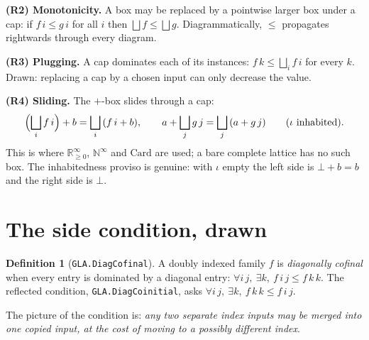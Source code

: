 \documentclass[11pt,a4paper]{article}
\newcommand{\lean}[1]{\texttt{\small #1}}
\newcommand{\Rzi}{\mathbb{R}_{\geq 0}^{\infty}}
\newcommand{\Ninf}{\mathbb{N}^{\infty}}
\newcommand{\Card}{\mathrm{Card}}
\theoremstyle{definition}
\newtheorem{definition}{Definition}[section]
\theoremstyle{plain}
\theoremstyle{remark}
\begin{document}
\medskip
\noindent\textbf{(R2) Monotonicity.} A box may be replaced by a pointwise
larger box under a cap: if $f\,i\le g\,i$ for all $i$ then
$\bigsqcup f\le\bigsqcup g$. Diagrammatically, $\le$ propagates rightwards
through every diagram.

\medskip
\noindent\textbf{(R3) Plugging.} A cap dominates each of its instances:
$f\,k\le\bigsqcup_i f\,i$ for every $k$. Drawn: replacing a cap by a chosen
input can only decrease the value.

\medskip
\noindent\textbf{(R4) Sliding.} The $+$-box slides through a cap:
\[
\Bigl(\bigsqcup_i f\,i\Bigr)+b=\bigsqcup_i\,(f\,i+b),
\qquad
a+\bigsqcup_j g\,j=\bigsqcup_j\,(a+g\,j)
\qquad(\iota\ \text{inhabited}).
\]
This is where $\Rzi$, $\Ninf$ and $\Card$ are used; a bare complete lattice has
no such box. The inhabitedness proviso is genuine: with $\iota$ empty the left
side is $\bot+b=b$ and the right side is $\bot$.

\section{The side condition, drawn}

\begin{definition}[\lean{GLA.DiagCofinal}]
A doubly indexed family $f$ is \emph{diagonally cofinal} when every entry is
dominated by a diagonal entry:
$\forall i\,j,\ \exists k,\ f\,i\,j\le f\,k\,k$.
The reflected condition, \lean{GLA.DiagCoinitial}, asks
$\forall i\,j,\ \exists k,\ f\,k\,k\le f\,i\,j$.
\end{definition}

The picture of the condition is: \emph{any two separate index inputs may be
merged into one copied input, at the cost of moving to a possibly different
index}.

\begin{center}
\end{center}
\end{document}
